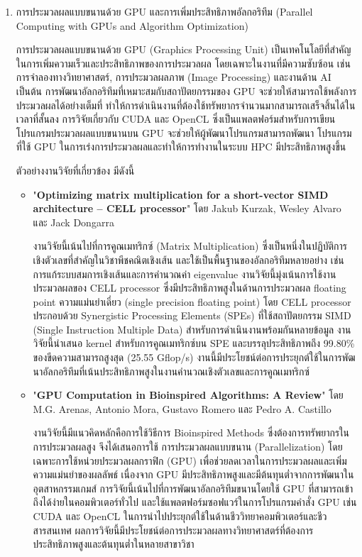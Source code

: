 \documentclass[a4paper,12pt]{extarticle}
\begin{document}
\begin{enumerate}
	\item การประมวลผลแบบขนานด้วย GPU และการเพิ่มประสิทธิภาพอัลกอริทึม (Parallel Computing with GPUs and Algorithm Optimization) %

	การประมวลผลแบบขนานด้วย GPU (Graphics Processing Unit) เป็นเทคโนโลยีที่สำคัญในการเพิ่มความเร็วและประสิทธิภาพของการประมวลผล โดยเฉพาะในงานที่มีความซับซ้อน เช่น การจำลองทางวิทยาศาสตร์, การประมวลผลภาพ (Image Processing) และงานด้าน AI เป็นต้น การพัฒนาอัลกอริทึมที่เหมาะสมกับสถาปัตยกรรมของ GPU จะช่วยให้สามารถใช้พลังการประมวลผลได้อย่างเต็มที่ ทำให้การดำเนินงานที่ต้องใช้ทรัพยากรจำนวนมากสามารถเสร็จสิ้นได้ในเวลาที่สั้นลง การวิจัยเกี่ยวกับ CUDA และ OpenCL ซึ่งเป็นแพลตฟอร์มสำหรับการเขียนโปรแกรมประมวลผลแบบขนานบน GPU จะช่วยให้ผู้พัฒนาโปรแกรมสามารถพัฒนา โปรแกรมที่ใช้ GPU ในการเร่งการประมวลผลและทำให้การทำงานในระบบ HPC มีประสิทธิภาพสูงขึ้น

	ตัวอย่างงานวิจัยที่เกี่ยวข้อง มีดังนี้
	\begin{itemize}
		\item "\textbf{Optimizing matrix multiplication for a short-vector SIMD architecture – CELL processor}" โดย Jakub Kurzak, Wesley Alvaro และ Jack Dongarra

		งานวิจัยนี้เน้นไปที่การคูณเมทริกซ์ (Matrix Multiplication) ซึ่งเป็นหนึ่งในปฏิบัติการเชิงตัวเลขที่สำคัญในวิชาพีชคณิตเชิงเส้น และใช้เป็นพื้นฐานของอัลกอริทึมหลายอย่าง เช่น การแก้ระบบสมการเชิงเส้นและการคำนวณค่า eigenvalue งานวิจัยนี้มุ่งเน้นการใช้งานประมวลผลของ CELL processor ซึ่งมีประสิทธิภาพสูงในด้านการประมวลผล floating point ความแม่นยำเดี่ยว (single precision floating point) โดย CELL processor ประกอบด้วย Synergistic Processing Elements (SPEs) ที่ใช้สถาปัตยกรรม SIMD (Single Instruction Multiple Data) สำหรับการดำเนินงานพร้อมกันหลายข้อมูล งานวิจัยนี้นำเสนอ kernel สำหรับการคูณเมทริกซ์บน SPE และบรรลุประสิทธิภาพถึง 99.80\% ของขีดความสามารถสูงสุด (25.55 Gflop/s) งานนี้มีประโยชน์ต่อการประยุกต์ใช้ในการพัฒนาอัลกอริทึมที่เน้นประสิทธิภาพสูงในงานคำนวณเชิงตัวเลขและการคูณเมทริกซ์
		\item "\textbf{GPU Computation in Bioinspired Algorithms: A Review}" โดย M.G. Arenas, Antonio Mora, Gustavo Romero และ Pedro A. Castillo

		งานวิจัยนี้มีแนวคิดหลักคือการใช้วิธีการ Bioinspired Methods ซึ่งต้องการทรัพยากรในการประมวลผลสูง จึงได้เสนอการใช้ การประมวลผลแบบขนาน (Parallelization) โดยเฉพาะการใช้หน่วยประมวลผลกราฟิก (GPU) เพื่อช่วยลดเวลาในการประมวลผลและเพิ่มความแม่นยำของผลลัพธ์ เนื่องจาก GPU มีประสิทธิภาพสูงและมีต้นทุนต่ำจากการพัฒนาในอุตสาหกรรมเกมส์ การวิจัยนี้เน้นไปที่การพัฒนาอัลกอริทึมขนานโดยใช้ GPU ที่สามารถเข้าถึงได้ง่ายในคอมพิวเตอร์ทั่วไป และใช้แพลตฟอร์มซอฟแวร์ในการโปรแกรมคำสั่ง GPU เช่น CUDA และ OpenCL ในการนำไปประยุกต์ใช้ในด้านชีววิทยาคอมพิวเตอร์และชีวสารสนเทศ ผลการวิจัยนี้มีประโยชน์ต่อการประมวลผลทางวิทยาศาสตร์ที่ต้องการประสิทธิภาพสูงและต้นทุนต่ำในหลายสาขาวิชา
	\end{itemize}


\end{enumerate}
\end{document}
